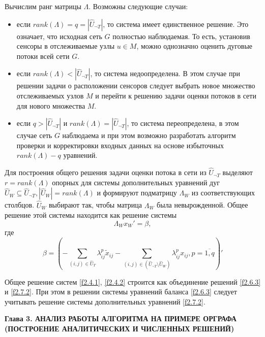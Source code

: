 \documentclass[14pt]{extarticle}%
\begin{document}
Вычислим ранг матрицы $\Lambda$. Возможны следующие случаи:
\begin{itemize}
    \item если $rank(\Lambda)=q=|\widehat{U}_{\neg T}|$, то система имеет единственное решение. Это означает, что исходная сеть $G$ полностью наблюдаемая. То есть, установив сенсоры в отслеживаемые узлы $u\in M$, можно однозначно оценить дуговые потоки всей сети $G$.
    \item если $rank(\Lambda)<|\widehat{U}_{\neg T}|$, то система недоопределена. В этом случае при решении задачи о расположении сенсоров следует выбрать новое множество отслеживаемых узлов $M$ и перейти к решению задачи оценки потоков в сети для нового множества $M$.  
    \item если $q>|\widehat{U}_{\neg T}|$ и $rank(\Lambda)=|\widehat{U}_{\neg T}|$, то система переопределена, в этом случае сеть $G$ наблюдаема и при этом возможно разработать алгоритм проверки и корректировки входных данных на основе избыточных $rank(\Lambda)-q$ уравнений.
\end{itemize}

Для построения общего решения задачи оценки потока в сети из $\widehat{U}_{\neg T}$ выделяют $r=rank(\Lambda)$ опорных для системы дополнительных уравнений дуг $\widehat{U}_W\subseteq\widehat{U}_{\neg T}, |\widehat{U}_W|=rank(\Lambda)$ и формируют подматрицу $\Lambda_W$ из соответствующих столбцов. $\widehat{U}_W$ выбирают так, чтобы матрица $\Lambda_W$ была невырожденной.
Общее решение этой системы находится как решение системы 
\begin{equation}\label{f2.7.2}
	\Lambda_W x_W'=\beta,
\end{equation}
где
\begin{equation}\label{f2.7.3}
	\beta = \left(-\sum_{(i,j)\in \widehat{U}_T}\lambda^p_{ij}\widetilde{x}_{ij}-\sum_{(i,j)\in (\widehat{U}_{\neg T}\setminus\widehat{U}_W)}\lambda^p_{ij}x_{ij}, p=\overline{1,q}\right)'
\end{equation}

Общее решение систем \eqref{f2.4.1}, \eqref{f2.4.2} строится как объединение решений \eqref{f2.6.3} и \eqref{f2.7.2}. При этом в решении системы уравнений баланса \eqref{f2.6.3} следует учитывать решение системы дополнительных уравнений \eqref{f2.7.2}.
\newpage
\begin{center}
\textbf{Глава 3. АНАЛИЗ РАБОТЫ АЛГОРИТМА НА ПРИМЕРЕ ОРГРАФА (ПОСТРОЕНИЕ АНАЛИТИЧЕСКИХ И ЧИСЛЕННЫХ РЕШЕНИЙ)}
\end{center}
\end{document}
